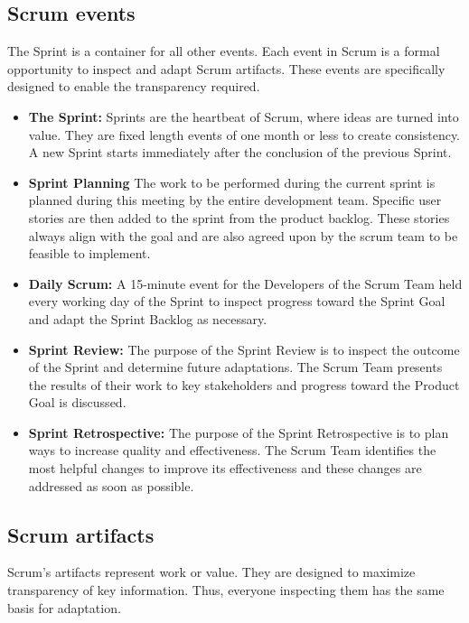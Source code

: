 \subsection{Scrum events}
The Sprint is a container for all other events. Each event in Scrum is a formal opportunity to inspect
and adapt Scrum artifacts. These events are specifically designed to enable the transparency required.

\begin{itemize}
      \item \textbf{The Sprint:} Sprints are the heartbeat of Scrum, where ideas are turned into value.
            They are fixed length events of one month or less to create consistency. A new Sprint starts
            immediately after the conclusion of the previous Sprint.
      \item \textbf{Sprint Planning} The work to be performed during the current sprint is planned during
            this meeting by the entire development team. Specific user stories are then added to the sprint from
            the product backlog. These stories always align with the goal and are also agreed upon by the scrum
            team to be feasible to implement.
      \item \textbf{Daily Scrum:} A 15-minute event for the Developers of the Scrum Team
            held every working day of the Sprint to inspect progress toward the Sprint Goal and adapt the Sprint
            Backlog as necessary.
      \item \textbf{Sprint Review:} The purpose of the Sprint Review is to inspect the outcome of the
            Sprint and determine future adaptations. The Scrum Team presents the results of their work to key
            stakeholders and progress toward the Product Goal is discussed.
      \item \textbf{Sprint Retrospective:} The purpose of the Sprint Retrospective is to plan ways to
            increase quality and effectiveness. The Scrum Team identifies the most helpful changes to improve
            its effectiveness and these changes are addressed as soon as possible.
\end{itemize}


\subsection{Scrum artifacts}
Scrum’s artifacts represent work or value. They are designed to maximize transparency of key information.
Thus, everyone inspecting them has the same basis for adaptation.

